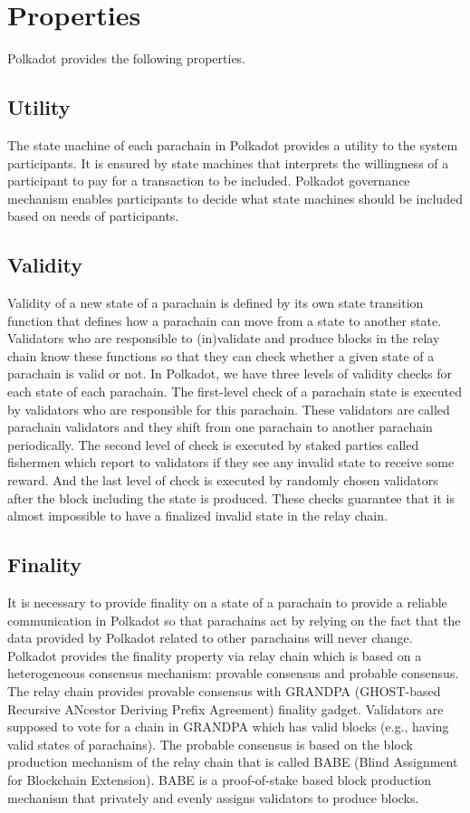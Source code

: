 \section{Properties}\label{sec:properties}

Polkadot provides the following properties.
 \subsection{Utility}

 The state machine of each parachain in Polkadot provides a utility to the system participants. It is ensured by state machines that interprets the willingness of a participant to pay for a transaction to be included.  Polkadot governance mechanism enables participants to decide what state machines should be included based on needs of participants.



 \subsection{Validity}
Validity of a new state of a parachain is defined by its own state transition function that defines how a parachain can move from a state to another state.   Validators who are responsible to (in)validate and produce blocks in the relay chain  know these functions so that they can  check whether a given state of a parachain is valid or not.  In Polkadot, we have three levels of validity checks for each state of each parachain. The first-level check of a parachain state is executed by validators who are responsible for this parachain. These validators are called parachain validators and they shift from one parachain to another parachain periodically. The second level of check is executed by staked parties called fishermen which report to validators if they see any invalid state to receive some reward. And the last level of check is executed by randomly chosen validators after the block including the state is produced. These checks guarantee that it is almost impossible to have a finalized invalid state in the relay chain.

 \subsection{Finality}

 It is necessary to provide finality on a state of a parachain  to provide a reliable communication in Polkadot so that parachains act by relying on the fact that the data provided by Polkadot related to other parachains will never change.  Polkadot provides the finality property via relay chain which is based on a heterogeneous consensus mechanism: provable consensus and probable consensus. The relay chain provides provable consensus with GRANDPA (GHOST-based Recursive ANcestor Deriving Prefix Agreement)  finality gadget. Validators are supposed to vote for a chain in GRANDPA  which has valid blocks (e.g., having valid states of parachains). The probable consensus is based on the block production mechanism of the relay chain that is called BABE (Blind Assignment for Blockchain Extension). BABE is a proof-of-stake based block production mechanism that privately and evenly assigns validators to produce blocks.


